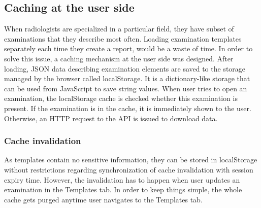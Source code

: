 \documentclass[12pt, twoside, openany]{report}
\theoremstyle{definition}
\begin{document}
\subsection{Caching at the user side}
When radiologists are specialized in a particular field, they have subset of examinations that they describe most often. Loading examination templates separately each time they create a report, would be a waste of time. In order to solve this issue, a caching mechanism at the user side was designed. After loading, JSON data describing examination elements are saved to the storage managed by the browser called localStorage. It is a dictionary-like storage that can be used from JavaScript to save string values. When user tries to open an examination, the localStorage cache is checked whether this examination is present. If the examination is in the cache, it is immediately shown to the user. Otherwise, an HTTP request to the API is issued to download data.

\subsubsection{Cache invalidation}
As templates contain no sensitive information, they can be stored in localStorage without restrictions regarding synchronization of cache invalidation with session expiry time. However, the invalidation has to happen when user updates an examination in the Templates tab. In order to keep things simple, the whole cache gets purged anytime user navigates to the Templates tab. 

\end{document}
